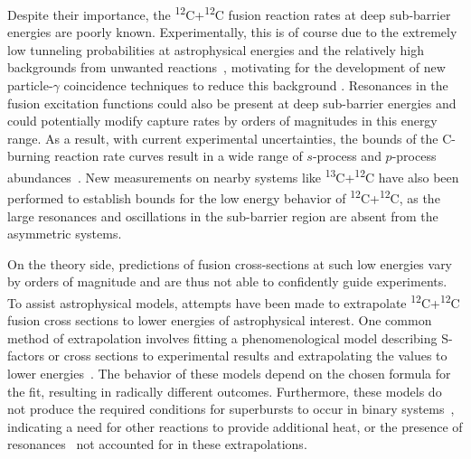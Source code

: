 Despite their importance, the \textsuperscript{12}C+\textsuperscript{12}C fusion reaction rates at deep sub-barrier energies are poorly known. 
Experimentally, this is of course due to the extremely low tunneling probabilities at astrophysical energies 
and the relatively high backgrounds from unwanted reactions~\protect\citep{spillane2007,zickefoose2011}, 
motivating for the development of new particle-$\gamma$ coincidence techniques to reduce this background \protect\citep{courtin2017,jiang2018}. 
Resonances in the fusion excitation functions could also be present at deep sub-barrier energies \protect\citep{cooper2009,tumino2018} 
and could potentially modify capture rates by orders of magnitudes in this energy range. 
As a result, with current experimental uncertainties, 
the bounds of the C-burning reaction rate curves result in a wide range of $s$-process and $p$-process abundances~\protect\citep{pignatari2012}.
New measurements on nearby systems  like \textsuperscript{13}C+\textsuperscript{12}C \protect\citep{zhang2018}
have also been performed to establish bounds for the low energy behavior of \textsuperscript{12}C+\textsuperscript{12}C, 
as the large resonances and oscillations in the sub-barrier region are absent from the asymmetric systems. 

On the theory side, predictions of fusion cross-sections at such low energies vary by orders of magnitude and are thus not able to confidently guide experiments. 
To assist astrophysical models, attempts have been made to extrapolate \textsuperscript{12}C+\textsuperscript{12}C fusion cross sections to lower energies of astrophysical interest. 
One common method of extrapolation involves fitting a phenomenological model describing S-factors or cross sections to experimental results and extrapolating the values to lower energies~\protect\citep{fowler1975,jiang2007}.
The behavior of these models depend on the chosen formula for the fit, resulting in radically different outcomes.
Furthermore, these models 
do not produce the required conditions for superbursts to occur in binary systems~\protect\citep{cumming2006}, indicating a need for other reactions to provide additional heat, or the presence of resonances~\protect\citep{cooper2009} not accounted for in these extrapolations. 


